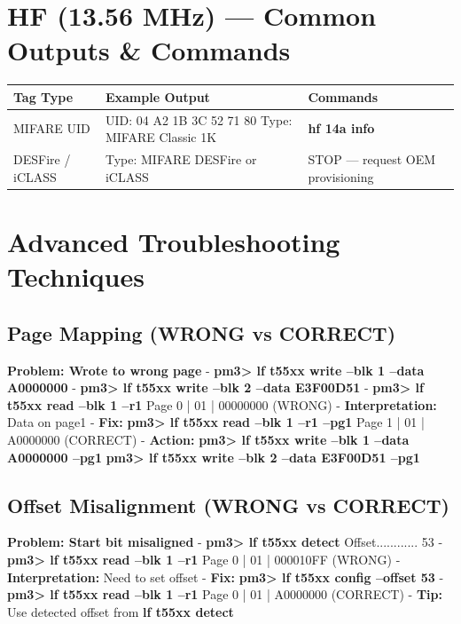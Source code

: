 \documentclass[a4paper,12pt]{article}
\begin{document}
\section*{HF (13.56 MHz) — Common Outputs \& Commands}
\begin{center}
\begin{tabular}{p{4cm} p{6cm} p{5cm}}
\toprule
\textbf{Tag Type} & \textbf{Example Output} & \textbf{Commands} \\
\midrule
MIFARE UID & \large{UID: 04 A2 1B 3C 52 71 80 Type: MIFARE Classic 1K} & \textbf{hf 14a info} \\
DESFire / iCLASS & \large{Type: MIFARE DESFire or iCLASS} & STOP — request OEM provisioning \\
\bottomrule
\end{tabular}
\end{center}

\section*{Advanced Troubleshooting Techniques}

\subsection*{Page Mapping (WRONG vs CORRECT)}
\textbf{Problem: Wrote to wrong page}
- \textbf{pm3> lf t55xx write --blk 1 --data A0000000}
- \textbf{pm3> lf t55xx write --blk 2 --data E3F00D51}
- \textbf{pm3> lf t55xx read --blk 1 --r1} \large{Page 0 | 01 | 00000000} (WRONG)
- \textbf{Interpretation:} Data on page1
- \textbf{Fix:} \textbf{pm3> lf t55xx read --blk 1 --r1 --pg1} \large{Page 1 | 01 | A0000000} (CORRECT)
- \textbf{Action:} \textbf{pm3> lf t55xx write --blk 1 --data A0000000 --pg1} \newline \textbf{pm3> lf t55xx write --blk 2 --data E3F00D51 --pg1}

\subsection*{Offset Misalignment (WRONG vs CORRECT)}
\textbf{Problem: Start bit misaligned}
- \textbf{pm3> lf t55xx detect} \large{Offset............ 53}
- \textbf{pm3> lf t55xx read --blk 1 --r1} \large{Page 0 | 01 | 000010FF} (WRONG)
- \textbf{Interpretation:} Need to set offset
- \textbf{Fix:} \textbf{pm3> lf t55xx config --offset 53}
- \textbf{pm3> lf t55xx read --blk 1 --r1} \large{Page 0 | 01 | A0000000} (CORRECT)
- \textbf{Tip:} Use detected offset from \textbf{lf t55xx detect}
\end{document}
